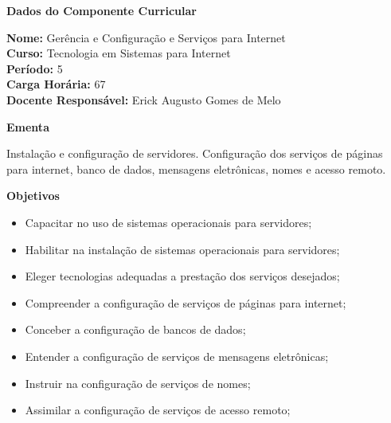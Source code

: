 

\begin{snugshade}\begin{center}\textbf{
    Dados do Componente Curricular
}\end{center}\end{snugshade}

\noindent \textbf{Nome:}                Gerência e Configuração e Serviços para Internet
\\        \textbf{Curso:}               Tecnologia em Sistemas para Internet
\\        \textbf{Período:}             \unit{5}{\degree}
\\        \textbf{Carga Horária:}       \unit{67}{\hour}
\\        \textbf{Docente Responsável:} Erick Augusto Gomes de Melo


\begin{snugshade}\begin{center}\textbf{
    Ementa
\vphantom{q}}\end{center}\end{snugshade}

\noindent
Instalação e configuração de servidores. Configuração dos serviços de páginas para internet, banco de dados, mensagens eletrônicas, nomes e acesso remoto.


\begin{snugshade}\begin{center}\textbf{
    Objetivos
}\end{center}\end{snugshade}

\begin{itemize}

\item Capacitar no uso de sistemas operacionais para servidores;

\item Habilitar na instalação de sistemas operacionais para servidores;

\item Eleger tecnologias adequadas a prestação dos serviços desejados;

\item Compreender a configuração de serviços de páginas para internet;

\item Conceber a configuração de bancos de dados;

\item Entender a configuração de serviços de mensagens eletrônicas;

\item Instruir na configuração de serviços de nomes;

\item Assimilar a configuração de serviços de acesso remoto;

\end{itemize} 

